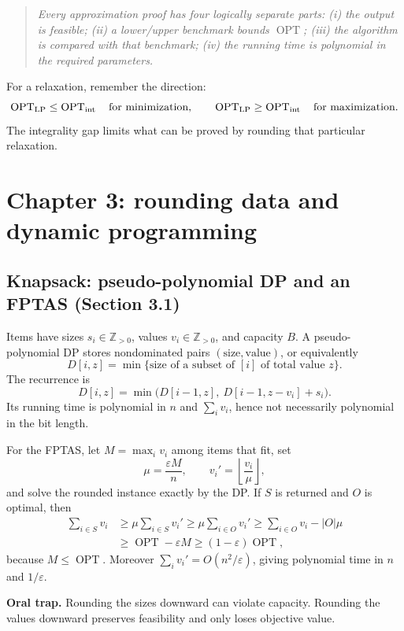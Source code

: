 \documentclass[11pt,a4paper]{article}
\newcommand{\OPT}{\operatorname{OPT}}
\newcommand{\1}{\mathbf 1}
\newenvironment{keybox}{\begin{quote}\small\itshape}{\end{quote}}
\begin{document}
\begin{keybox}
Every approximation proof has four logically separate parts: (i) the output is
feasible; (ii) a lower/upper benchmark bounds $\OPT$; (iii) the algorithm is compared
with that benchmark; (iv) the running time is polynomial in the required parameters.
\end{keybox}

For a relaxation, remember the direction:
\[
  \OPT_{\rm LP}\leq\OPT_{\rm int}\quad\text{for minimization},
  \qquad
  \OPT_{\rm LP}\geq\OPT_{\rm int}\quad\text{for maximization}.
\]
The integrality gap limits what can be proved by rounding that particular relaxation.

\section{Chapter 3: rounding data and dynamic programming}

\subsection{Knapsack: pseudo-polynomial DP and an FPTAS (Section 3.1)}

Items have sizes $s_i\in\mathbb Z_{>0}$, values $v_i\in\mathbb Z_{>0}$, and
capacity $B$.  A pseudo-polynomial DP stores nondominated pairs
$(\text{size},\text{value})$, or equivalently
\[
 D[i,z]=\min\{\text{size of a subset of }[i]\text{ of total value }z\}.
\]
The recurrence is
\[
 D[i,z]=\min\bigl(D[i-1,z],\ D[i-1,z-v_i]+s_i\bigr).
\]
Its running time is polynomial in $n$ and $\sum_i v_i$, hence not necessarily
polynomial in the bit length.

For the FPTAS, let $M=\max_i v_i$ among items that fit, set
\[
  \mu=\frac{\varepsilon M}{n},
  \qquad v_i'=\left\lfloor\frac{v_i}{\mu}\right\rfloor,
\]
and solve the rounded instance exactly by the DP.  If $S$ is returned and $O$ is
optimal, then
\begin{align*}
 \sum_{i\in S}v_i
 &\geq \mu\sum_{i\in S}v_i'
 \geq \mu\sum_{i\in O}v_i'
 \geq \sum_{i\in O}v_i-|O|\mu\\
 &\geq \OPT-\varepsilon M
 \geq(1-\varepsilon)\OPT,
\end{align*}
because $M\leq\OPT$.  Moreover
$\sum_i v_i'=O(n^2/\varepsilon)$, giving polynomial time in $n$ and
$1/\varepsilon$.

\textbf{Oral trap.}  Rounding the sizes downward can violate capacity.  Rounding the
values downward preserves feasibility and only loses objective value.
\end{document}
